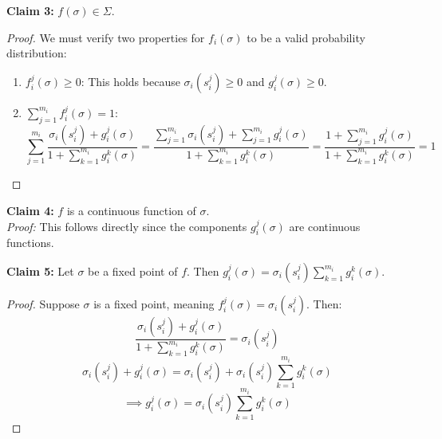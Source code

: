 \documentclass[12pt, a4paper]{article}
\begin{document}
\textbf{Claim 3:} $f(\sigma) \in \Sigma$.
\begin{proof}
  We must verify two properties for $f_i(\sigma)$ to be a valid probability distribution:
  \begin{enumerate}
      \item $f_i^j(\sigma) \geq 0$: This holds because $\sigma_i(s_i^j) \geq 0$ and $g_i^j(\sigma) \geq 0$.
      \item $\sum_{j=1}^{m_i} f_i^j(\sigma) = 1$: 
      \[ \sum_{j=1}^{m_i} \frac{\sigma_i(s_i^j) + g_i^j(\sigma)}{1 + \sum_{k=1}^{m_i} g_i^k(\sigma)} = \frac{\sum_{j=1}^{m_i} \sigma_i(s_i^j) + \sum_{j=1}^{m_i} g_i^j(\sigma)}{1 + \sum_{k=1}^{m_i} g_i^k(\sigma)} = \frac{1 + \sum_{j=1}^{m_i} g_i^j(\sigma)}{1 + \sum_{k=1}^{m_i} g_i^k(\sigma)} = 1 \]
  \end{enumerate}
\end{proof}

\textbf{Claim 4:} $f$ is a continuous function of $\sigma$. \\
\textit{Proof:} This follows directly since the components $g_i^j(\sigma)$ are continuous functions.

\textbf{Claim 5:} Let $\sigma$ be a fixed point of $f$. Then $g_i^j(\sigma) = \sigma_i(s_i^j) \sum_{k=1}^{m_i} g_i^k(\sigma)$.
\begin{proof}
  Suppose $\sigma$ is a fixed point, meaning $f_i^j(\sigma) = \sigma_i(s_i^j)$. Then:
  \[ \frac{\sigma_i(s_i^j) + g_i^j(\sigma)}{1 + \sum_{k=1}^{m_i} g_i^k(\sigma)} = \sigma_i(s_i^j) \]
  \[ \sigma_i(s_i^j) + g_i^j(\sigma) = \sigma_i(s_i^j) + \sigma_i(s_i^j) \sum_{k=1}^{m_i} g_i^k(\sigma) \]
  \[ \implies g_i^j(\sigma) = \sigma_i(s_i^j) \sum_{k=1}^{m_i} g_i^k(\sigma) \]
\end{proof}
\end{document}

